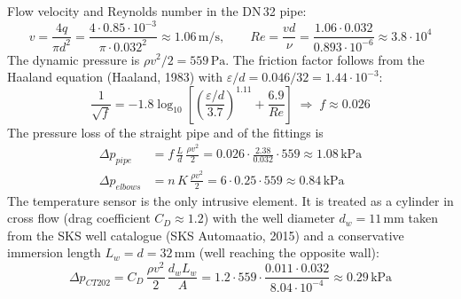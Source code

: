\documentclass[11pt,a4paper]{article}
\begin{document}
Flow velocity and Reynolds number in the DN\,32 pipe:
\begin{equation}
    v = \frac{4q}{\pi d^2} = \frac{4 \cdot 0.85\cdot 10^{-3}}{\pi \cdot 0.032^2} \approx 1.06\,\text{m/s}, \qquad
    Re = \frac{v d}{\nu} = \frac{1.06 \cdot 0.032}{0.893\cdot 10^{-6}} \approx 3.8\cdot 10^{4}
\end{equation}
The dynamic pressure is $\rho v^2/2 = 559\,\text{Pa}$. The friction factor follows from the Haaland equation (Haaland, 1983) with $\varepsilon/d = 0.046/32 = 1.44\cdot 10^{-3}$:
\begin{equation}
    \frac{1}{\sqrt{f}} = -1.8 \log_{10}\!\left[\left(\frac{\varepsilon/d}{3.7}\right)^{1.11} + \frac{6.9}{Re}\right] \;\Rightarrow\; f \approx 0.026
\end{equation}
The pressure loss of the straight pipe and of the fittings is
\begin{align}
    \Delta p_{pipe} &= f\,\frac{L}{d}\,\frac{\rho v^2}{2} = 0.026 \cdot \frac{2.38}{0.032} \cdot 559 \approx 1.08\,\text{kPa} \\
    \Delta p_{elbows} &= n\,K\,\frac{\rho v^2}{2} = 6 \cdot 0.25 \cdot 559 \approx 0.84\,\text{kPa}
\end{align}
The temperature sensor is the only intrusive element. It is treated as a cylinder in cross flow (drag coefficient $C_D \approx 1.2$) with the well diameter $d_w = 11\,\text{mm}$ taken from the SKS well catalogue (SKS Automaatio, 2015) and a conservative immersion length $L_w = d = 32\,\text{mm}$ (well reaching the opposite wall):
\begin{equation}
    \Delta p_{CT202} = C_D\,\frac{\rho v^2}{2}\,\frac{d_w L_w}{A} = 1.2 \cdot 559 \cdot \frac{0.011 \cdot 0.032}{8.04\cdot 10^{-4}} \approx 0.29\,\text{kPa}
\end{equation}
\end{document}

